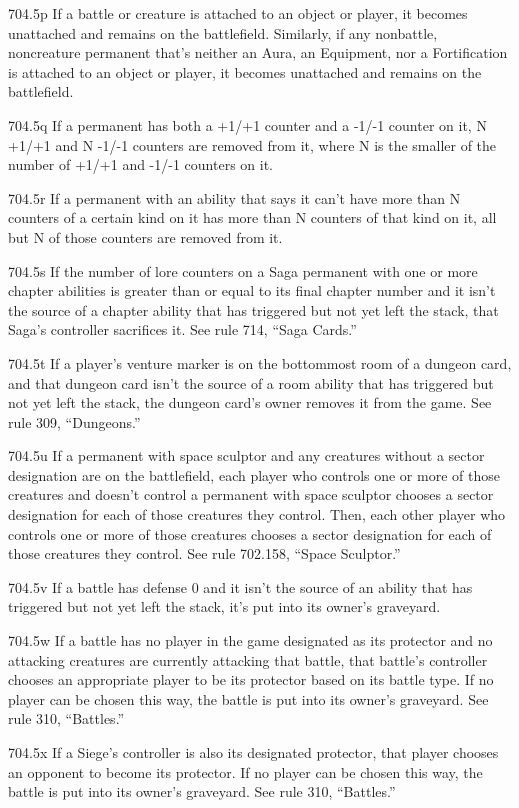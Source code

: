 704.5p If a battle or creature is attached to an object or player, it becomes unattached and remains on the battlefield. Similarly, if any nonbattle, noncreature permanent that’s neither an Aura, an Equipment, nor a Fortification is attached to an object or player, it becomes unattached and remains on the battlefield.

704.5q If a permanent has both a +1/+1 counter and a -1/-1 counter on it, N +1/+1 and N -1/-1 counters are removed from it, where N is the smaller of the number of +1/+1 and -1/-1 counters on it.

704.5r If a permanent with an ability that says it can’t have more than N counters of a certain kind on it has more than N counters of that kind on it, all but N of those counters are removed from it.

704.5s If the number of lore counters on a Saga permanent with one or more chapter abilities is greater than or equal to its final chapter number and it isn’t the source of a chapter ability that has triggered but not yet left the stack, that Saga’s controller sacrifices it. See rule 714, “Saga Cards.”

704.5t If a player’s venture marker is on the bottommost room of a dungeon card, and that dungeon card isn’t the source of a room ability that has triggered but not yet left the stack, the dungeon card’s owner removes it from the game. See rule 309, “Dungeons.”

704.5u If a permanent with space sculptor and any creatures without a sector designation are on the battlefield, each player who controls one or more of those creatures and doesn’t control a permanent with space sculptor chooses a sector designation for each of those creatures they control. Then, each other player who controls one or more of those creatures chooses a sector designation for each of those creatures they control. See rule 702.158, “Space Sculptor.”

704.5v If a battle has defense 0 and it isn’t the source of an ability that has triggered but not yet left the stack, it’s put into its owner’s graveyard.

704.5w If a battle has no player in the game designated as its protector and no attacking creatures are currently attacking that battle, that battle’s controller chooses an appropriate player to be its protector based on its battle type. If no player can be chosen this way, the battle is put into its owner’s graveyard. See rule 310, “Battles.”

704.5x If a Siege’s controller is also its designated protector, that player chooses an opponent to become its protector. If no player can be chosen this way, the battle is put into its owner’s graveyard. See rule 310, “Battles.”

